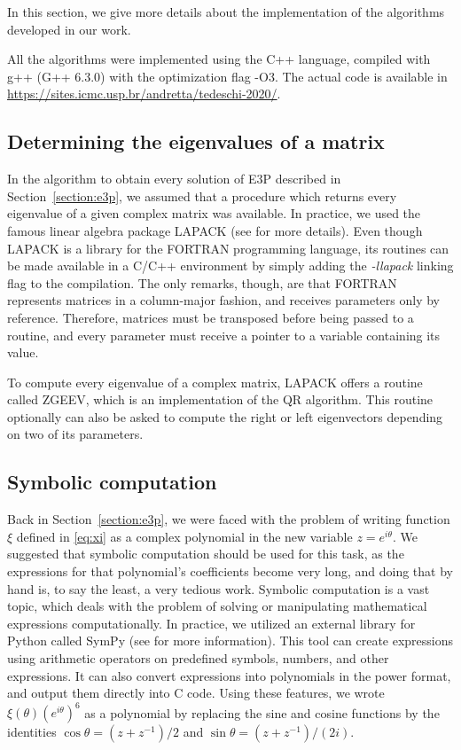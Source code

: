 In this section, we give more details about the implementation of the algorithms developed in our work.

All the algorithms were implemented using the C++ language, compiled with g++ (G++ 6.3.0) with the optimization flag -O3. The actual code is available in \url{https://sites.icmc.usp.br/andretta/tedeschi-2020/}.

\subsection{Determining the eigenvalues of a matrix}

In the algorithm to obtain every solution of E3P described in Section~\ref{section:e3p}, we assumed that a procedure which returns every eigenvalue of a given complex matrix was available. In practice, we used the famous linear algebra package LAPACK (see \cite{lapack} for more details).
Even though LAPACK is a library for the FORTRAN programming language, its routines can be made available in a C/C++ environment by simply adding the \textit{-llapack} linking flag to the compilation. The only remarks, though, are that FORTRAN represents matrices in a column-major fashion, and receives parameters only by reference. Therefore, matrices must be transposed before being passed to a routine, and every parameter must receive a pointer to a variable containing its value.

To compute every eigenvalue of a complex matrix, LAPACK offers a routine called ZGEEV, which is an implementation of the QR algorithm.
This routine optionally can also be asked to compute the right or left eigenvectors depending on two of its parameters. 


\subsection{Symbolic computation}


Back in Section~\ref{section:e3p}, we were faced with the problem of writing function $\xi$ defined in \autoref{eq:xi} as a complex polynomial in the new variable $z=e^{i\theta}$. We suggested that symbolic computation should be used for this task, as the expressions for that polynomial's coefficients become very long, and doing that by hand is, to say the least, a very tedious work.
Symbolic computation is a vast topic, which deals with the problem of solving or manipulating mathematical expressions computationally. 
In practice, we utilized an external library for Python called SymPy (see \cite{sympy} for more information).
This tool can create expressions using arithmetic operators on predefined symbols, numbers, and other expressions. It can also convert expressions into polynomials in the power format, and output them directly into C code. Using these features, we wrote $\xi(\theta)(e^{i\theta})^6$ as a polynomial by replacing the sine and cosine functions by the identities $\cos\theta=(z+z^{-1})/2$ and $\sin\theta=(z+z^{-1})/(2i)$.

